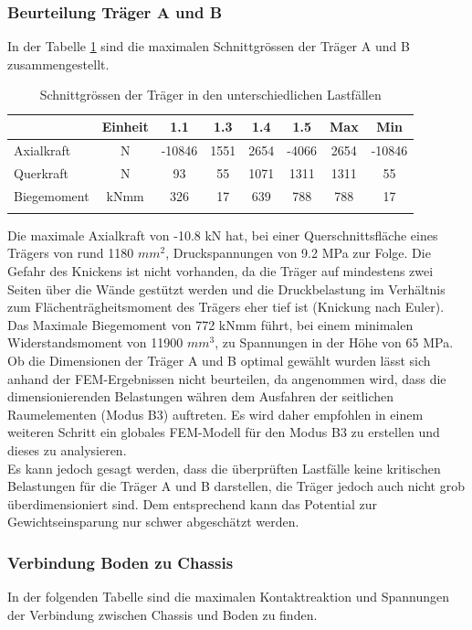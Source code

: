 \subsubsection{Beurteilung Träger A und B}
In der Tabelle \ref{tab:FEMres Träger} sind die maximalen Schnittgrössen der Träger A und B zusammengestellt.
\begin{table}[H]
\centering
\begin{tabular}{lccccccc}
\thickhline
	&	Einheit	&	1.1	&	1.3	&	1.4	&	1.5	&	Max	&	Min	\\	\hline
Axialkraft	&	N	&	-10846	&	1551	&	2654	&	-4066	&	2654	&	-10846	\\
Querkraft	&	N	&	93	&	55	&	1071	&	1311	&	1311	&	55	\\
Biegemoment	&	kNmm	&	326	&	17	&	639	&	788	&	788	&	17	\\	\thickhline
\end{tabular}
\caption{Schnittgrössen der Träger in den unterschiedlichen Lastfällen}
\label{tab:FEMres Träger}
\end{table}


Die maximale Axialkraft von -10.8 kN hat, bei einer Querschnittsfläche eines Trägers von rund 1180 $mm^2$, Druckspannungen von 9.2 MPa zur Folge. Die Gefahr des Knickens ist nicht vorhanden, da die Träger auf mindestens zwei Seiten über die Wände gestützt werden und die Druckbelastung im Verhältnis zum Flächenträgheitsmoment des Trägers eher tief ist (Knickung nach Euler). Das Maximale Biegemoment von 772 kNmm führt, bei einem minimalen Widerstandsmoment von 11900 $mm^3$, zu Spannungen in der Höhe von 65 MPa.\\
Ob die Dimensionen der Träger A und B optimal gewählt wurden lässt sich anhand der FEM-Ergebnissen nicht beurteilen, da angenommen wird, dass die dimensionierenden Belastungen währen dem Ausfahren der seitlichen Raumelementen (Modus B3) auftreten. Es wird daher empfohlen in einem weiteren Schritt ein globales FEM-Modell für den Modus B3 zu erstellen und dieses zu analysieren.\\
Es kann jedoch gesagt werden, dass die überprüften Lastfälle keine kritischen Belastungen für die Träger A und B darstellen, die Träger jedoch auch nicht grob überdimensioniert sind. Dem entsprechend kann das Potential zur Gewichtseinsparung nur schwer abgeschätzt werden.

\subsubsection{Verbindung Boden zu Chassis}
In der folgenden Tabelle sind die maximalen Kontaktreaktion und Spannungen der Verbindung zwischen Chassis und Boden zu finden.

